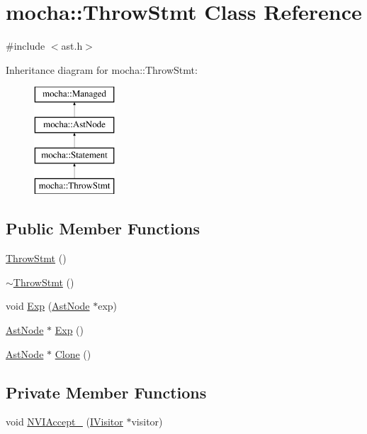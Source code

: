 \hypertarget{classmocha_1_1_throw_stmt}{
\section{mocha::ThrowStmt Class Reference}
\label{classmocha_1_1_throw_stmt}
}


{\ttfamily \#include $<$ast.h$>$}

Inheritance diagram for mocha::ThrowStmt:\begin{figure}[H]
\begin{center}
\leavevmode
\includegraphics[height=4.000000cm]{classmocha_1_1_throw_stmt}
\end{center}
\end{figure}
\subsection*{Public Member Functions}
\begin{DoxyCompactItemize}
\item 
\hyperlink{classmocha_1_1_throw_stmt_a682edbf66fe5184a02321f65d8fcc2ec}{ThrowStmt} ()
\item 
\hyperlink{classmocha_1_1_throw_stmt_af55857cdb98ef267adabbbd0a6ac98d7}{$\sim$ThrowStmt} ()
\item 
void \hyperlink{classmocha_1_1_throw_stmt_a61aa1f2c472ca4e7716a52e5e51cd013}{Exp} (\hyperlink{classmocha_1_1_ast_node}{AstNode} $\ast$exp)
\item 
\hyperlink{classmocha_1_1_ast_node}{AstNode} $\ast$ \hyperlink{classmocha_1_1_throw_stmt_aefdf85976dfbaa87ef850ff3553722f0}{Exp} ()
\item 
\hyperlink{classmocha_1_1_ast_node}{AstNode} $\ast$ \hyperlink{classmocha_1_1_throw_stmt_afcc1939aa533c7103945742c4b1df6d1}{Clone} ()
\end{DoxyCompactItemize}
\subsection*{Private Member Functions}
\begin{DoxyCompactItemize}
\item 
void \hyperlink{classmocha_1_1_throw_stmt_aa03f03d979f69c8ab2e415d1d5bd2dcf}{NVIAccept\_\-} (\hyperlink{classmocha_1_1_i_visitor}{IVisitor} $\ast$visitor)
\end{DoxyCompactItemize}
